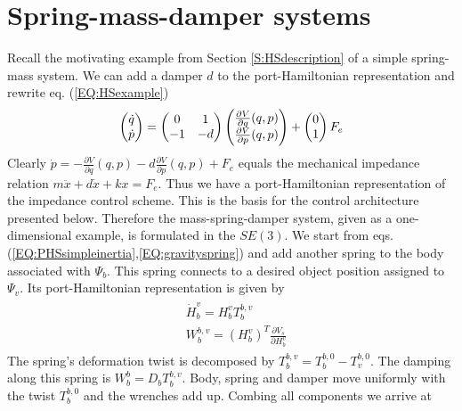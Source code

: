 \documentclass[a4paper,twoside, openright,12pt]{report}
\begin{document}
\section{Spring-mass-damper systems}\label{S:springmassdampers}
Recall the motivating example from Section \ref{S:HSdescription} of a simple spring-mass system. We can add a damper $d$ to the port-Hamiltonian representation and rewrite eq. (\ref{EQ:HSexample})
\begin{equation}
	\begin{pmatrix}\dot{q} \\ \dot{p}\end{pmatrix} =
	\begin{pmatrix}0 & 1 \\ -1 & -d\end{pmatrix}
	\begin{pmatrix}\frac{\partial V}{\partial q}(q,p) \\ \frac{\partial V}{\partial p}(q,p)\end{pmatrix} + 
	\begin{pmatrix}0 \\ 1\end{pmatrix} F_e\\  
\end{equation}
Clearly $\dot{p} = -\frac{\partial V}{\partial q}(q,p)-d\frac{\partial V}{\partial p}(q,p)+F_e$ equals the mechanical impedance relation $m\ddot{x} + d\dot{x} +kx = F_e$. Thus we have a port-Hamiltonian representation of the impedance control scheme. This is the basis for the control architecture presented below. Therefore the mass-spring-damper system, given as a one-dimensional example, is formulated in the $SE(3)$. We start from eqs. (\ref{EQ:PHSsimpleinertia},\ref{EQ:gravityspring}) and add another spring to the body associated with $\Psi_b$. This spring connects to a desired object position assigned to $\Psi_v$. Its port-Hamiltonian representation is given by
\begin{eqnarray}
\begin{aligned}
	&\dot{H}_b^v = H_b^v T_b^{b,v}\\
	&W_b^{b,v} = (H_b^v)^T\frac{\partial V_{s}}{\partial H_b^v}
\end{aligned}
\end{eqnarray}
The spring's deformation twist is decomposed by $T_b^{b,v} = T_b^{b,0} - T_v^{b,0}$.
The damping along this spring is $W_b^b = D_b T_b^{b,v} $. Body, spring and damper move uniformly with the twist $T_b^{b,0}$ and the wrenches add up. Combing all components we arrive at
\end{document}
